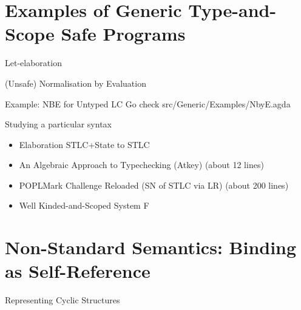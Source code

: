 \documentclass{beamer}
\begin{document}
\section{Examples of Generic Type-and-Scope Safe Programs}

\begin{frame}{Let-elaboration}
\end{frame}

\begin{frame}{(Unsafe) Normalisation by Evaluation}
  \hspace{-50pt}\begin{minipage}{0.9\textwidth}
  \end{minipage}
\end{frame}

\begin{frame}{Example: NBE for Untyped LC}
  Go check src/Generic/Examples/NbyE.agda
\end{frame}

\begin{frame}{Studying a particular syntax}
  \begin{itemize}
    \item Elaboration STLC+State to STLC
    \item An Algebraic Approach to Typechecking (Atkey) (about 12 lines)
    \item POPLMark Challenge Reloaded (SN of STLC via LR) (about 200 lines)
    \item Well Kinded-and-Scoped System F
  \end{itemize}
\end{frame}

\section{Non-Standard Semantics: Binding as Self-Reference}

\begin{frame}{Representing Cyclic Structures}
\end{frame}
\end{document}
